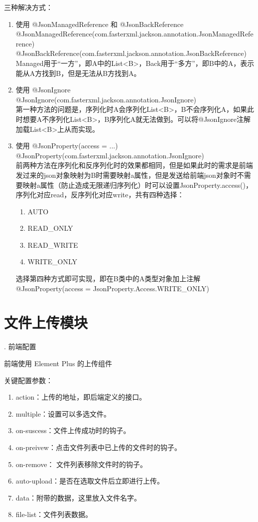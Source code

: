 三种解决方式：
\begin{enumerate}
  \item 使用 @JsonManagedReference 和 @JsonBackReference\\
        @JsonManagedReference(com.fasterxml.jackson.annotation.JsonManagedReference)\\
        @JsonBackReference(com.fasterxml.jackson.annotation.JsonBackReference)\\
        Managed用于“一方”，即A中的List<B>，Back用于“多方”，即B中的A，表示能从A方找到B，但是无法从B方找到A。
  \item 使用 @JsonIgnore\\
        @JsonIgnore(com.fasterxml.jackson.annotation.JsonIgnore)\\
        第一种方法的问题是，序列化时A会序列化List<B>，B不会序列化A，如果此时想要A不序列化List<B>，B序列化A就无法做到。可以将@JsonIgnore注解加载List<B>上从而实现。
  \item 使用 @JsonProperty(access = ...)\\
        @JsonProperty(com.fasterxml.jackson.annotation.JsonIgnore)\\
        前两种方法在序列化和反序列化时的效果都相同，但是如果此时的需求是前端发过来的json对象映射为B时需要映射a属性，但是发送给前端json对象时不需要映射a属性（防止造成无限递归序列化）时可以设置JsonProperty.access()，序列化对应read，反序列化对应write，共有四种选择：
        \begin{enumerate}[label=\circled{\arabic*}]
          \item AUTO
          \item READ\_ONLY
          \item READ\_WRITE
          \item WRITE\_ONLY
        \end{enumerate}
        选择第四种方式即可实现，即在B类中的A类型对象加上注解 @JsonProperty(access = JsonProperty.Access.WRITE\_ONLY)
\end{enumerate}

\section{文件上传模块}

. 前端配置

前端使用 Element Plus 的上传组件

关键配置参数：
\begin{enumerate}[label=\circled{\arabic*}]
  \item action：上传的地址，即后端定义的接口。
  \item multiple：设置可以多选文件。
  \item on-suscess：文件上传成功时的钩子。
  \item on-preivew：点击文件列表中已上传的文件时的钩子。
  \item on-remove：	文件列表移除文件时的钩子。
  \item auto-upload：是否在选取文件后立即进行上传。
  \item data：附带的数据，这里放入文件名字。
  \item file-list：文件列表数据。
\end{enumerate}

